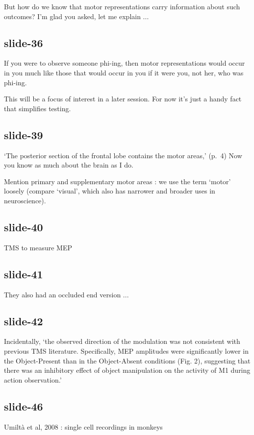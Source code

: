 \documentclass[12pt,\papersize]{extarticle}
\begin{document}
But how do we know that motor representations carry information about such outcomes?
I’m glad you asked, let me explain ...

\subsection{slide-36}
If you were to observe someone phi-ing,
then motor representations would occur in you
much like those that would occur in you if it were you, not her, who was phi-ing.

This will be a focus of interest in a later session.
For now it’s just a handy fact that simplifies testing.

\subsection{slide-39}
‘The posterior section of the frontal lobe contains the motor areas,’ (p.~4)
Now you know as much about the brain as I do.

Mention primary and supplementary motor areas : we use the term ‘motor’ loosely
(compare ‘visual’, which also has narrower and broader uses in
neuroscience).

\subsection{slide-40}
TMS to measure MEP

\subsection{slide-41}
They also had an occluded end version ...

\subsection{slide-42}
Incidentally, ‘the observed direction of the modulation was not consistent with previous TMS
literature. Specifically, MEP amplitudes were significantly lower in the Object-Present than in the
Object-Absent conditions (Fig. 2), suggesting that there was an inhibitory effect of object
manipulation on the activity of M1 during action observation.’

\subsection{slide-46}
Umiltà et al, 2008 : single cell recordings in monkeys
\end{document}
